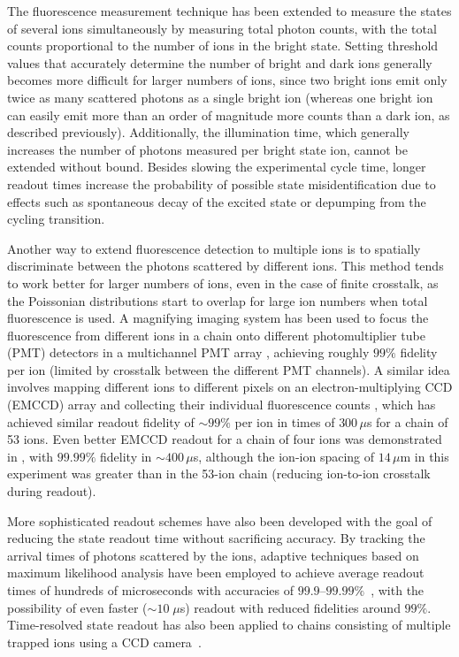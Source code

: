 \documentclass[%
12pt,
 amsmath,amssymb,
]{revtex4-2}
\begin{document}
The fluorescence measurement technique has been extended to measure the states of several ions simultaneously by measuring total photon counts, with the total counts proportional to the number of ions in the bright state. Setting threshold values that accurately determine the number of bright and dark ions generally becomes more difficult for larger numbers of ions, since two bright ions emit only twice as many scattered photons as a single bright ion (whereas one bright ion can easily emit more than an order of magnitude more counts than a dark ion, as described previously). Additionally, the illumination time, which generally increases the number of photons measured per bright state ion, cannot be extended without bound. Besides slowing the experimental cycle time, longer readout times increase the probability of possible state misidentification due to effects such as spontaneous decay of the excited state or depumping from the cycling transition.

Another way to extend fluorescence detection to multiple ions is to spatially discriminate between the photons scattered by different ions. This method tends to work better for larger numbers of ions, even in the case of finite crosstalk, as the Poissonian distributions start to overlap for large ion numbers when total fluorescence is used. A magnifying imaging system has been used to focus the fluorescence from different ions in a chain onto different photomultiplier tube (PMT) detectors in a multichannel PMT array \cite{Debnath5QubitComp2016}, achieving roughly $99 \%$ fidelity per ion (limited by crosstalk between the different PMT channels). A similar idea involves mapping different ions to different pixels on an electron-multiplying CCD (EMCCD) array and collecting their individual fluorescence counts \cite{Zhang53IonSim2017}, which has achieved similar readout fidelity of $\sim 99\%$ per ion in times of $300 \, \mu$s for a chain of 53 ions. Even better EMCCD readout for a chain of four ions was demonstrated in \cite{BurrellMultiqubit2010}, with $99.99 \%$ fidelity in $\sim 400 \, \mu$s, although the ion-ion spacing of $14 \, \mu$m in this experiment was greater than in the 53-ion chain (reducing ion-to-ion crosstalk during readout).

More sophisticated readout schemes have also been developed with the goal of reducing the state readout time without sacrificing accuracy. By tracking the arrival times of photons scattered by the ions, adaptive techniques based on maximum likelihood analysis have been employed to achieve average readout times of hundreds of microseconds with accuracies of $99.9$--$99.99 \%$~\cite{MyersonReadoutIons2008,noek2013high,HartyHighFidelityIons2014}, with the possibility of even faster ($\sim10 \; \mu$s) readout with reduced fidelities around $99 \%$. Time-resolved state readout has also been applied to chains consisting of multiple trapped ions using a CCD camera~\cite{BurrellMultiqubit2010}.
\end{document}
